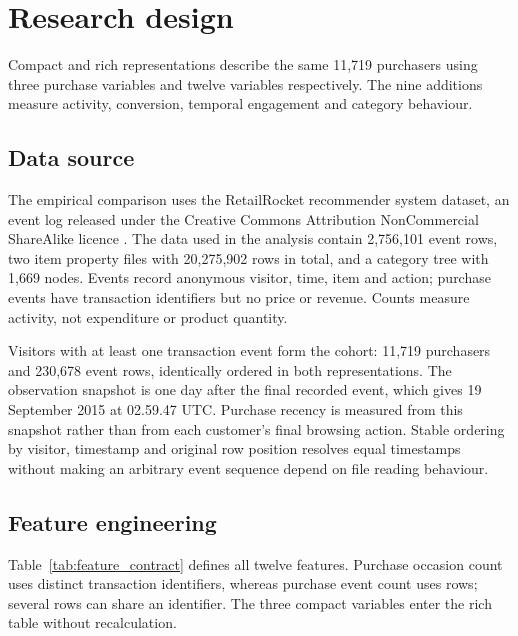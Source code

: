 \section{Research design}

Compact and rich representations describe the same 11,719 purchasers using three purchase variables and twelve variables respectively. The nine additions measure activity, conversion, temporal engagement and category behaviour.

\subsection{Data source}

The empirical comparison uses the RetailRocket recommender system dataset, an event log released under the Creative Commons Attribution NonCommercial ShareAlike licence \citep{retailrocketdataset}. The data used in the analysis contain 2,756,101 event rows, two item property files with 20,275,902 rows in total, and a category tree with 1,669 nodes. Events record anonymous visitor, time, item and action; purchase events have transaction identifiers but no price or revenue. Counts measure activity, not expenditure or product quantity.

Visitors with at least one transaction event form the cohort: 11,719 purchasers and 230,678 event rows, identically ordered in both representations. The observation snapshot is one day after the final recorded event, which gives 19 September 2015 at 02.59.47 UTC. Purchase recency is measured from this snapshot rather than from each customer's final browsing action. Stable ordering by visitor, timestamp and original row position resolves equal timestamps without making an arbitrary event sequence depend on file reading behaviour.

\subsection{Feature engineering}

Table~\ref{tab:feature_contract} defines all twelve features. Purchase occasion count uses distinct transaction identifiers, whereas purchase event count uses rows; several rows can share an identifier. The three compact variables enter the rich table without recalculation.

